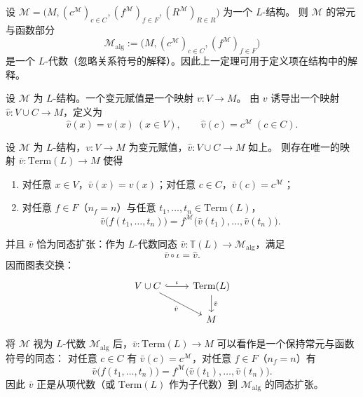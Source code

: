 \documentclass[lang=cn,a4paper,newtx,section]{elegantbook}
\begin{document}
\begin{remark}
设 $\mathcal M=\bigl(M,(c^{\mathcal M})_{c\in C},(f^{\mathcal M})_{f\in F},(R^{\mathcal M})_{R\in R}\bigr)$ 为一个 $L$-结构。
则 $\mathcal M$ 的常元与函数部分
\[
  \mathcal M_{\mathrm{alg}}:=\bigl(M,(c^{\mathcal M})_{c\in C},(f^{\mathcal M})_{f\in F}\bigr)
\]
是一个 $L$-代数（忽略关系符号的解释）。因此上一定理可用于定义项在结构中的解释。
\end{remark}

\begin{definition}[变元赋值]
设 $\mathcal M$ 为 $L$-结构。一个变元赋值是一个映射 $v:V\to M$。
由 $v$ 诱导出一个映射 $\hat v:V\cup C\to M$，定义为
\[
  \hat v(x)=v(x)\ (x\in V),\qquad \hat v(c)=c^{\mathcal M}\ (c\in C).
\]
\end{definition}

\begin{proposition}[项的解释]
设 $\mathcal M$ 为 $L$-结构，$v:V\to M$ 为变元赋值，$\hat v:V\cup C\to M$ 如上。
则存在唯一的映射 $\bar v:\mathrm{Term}(L)\to M$ 使得
\begin{enumerate}
  \item 对任意 $x\in V$，$\bar v(x)=v(x)$；对任意 $c\in C$，$\bar v(c)=c^{\mathcal M}$；
  \item 对任意 $f\in F$（$n_f=n$）与任意 $t_1,\dots,t_n\in\mathrm{Term}(L)$，
\[
  \bar v\bigl(f(t_1,\dots,t_n)\bigr)=f^{\mathcal M}\bigl(\bar v(t_1),\dots,\bar v(t_n)\bigr).
\]
\end{enumerate}
并且 $\bar v$ 恰为同态扩张：作为 $L$-代数同态 $\bar v:\mathbb T(L)\to \mathcal M_{\mathrm{alg}}$，满足
\[
  \bar v\circ\iota=\hat v.
\]
因而图表交换：
\[
\begin{tikzcd}
V\cup C \arrow[r, hook, "\iota"] \arrow[dr, "\hat v"'] & \mathrm{Term}(L) \arrow[d, "\bar v"] \\
& M
\end{tikzcd}
\]
\end{proposition}

\begin{remark}
将 $\mathcal M$ 视为 $L$-代数 $\mathcal M_{\mathrm{alg}}$ 后，$\bar v:\mathrm{Term}(L)\to M$ 可以看作是一个保持常元与函数符号的同态：
对任意 $c\in C$ 有 $\bar v(c)=c^{\mathcal M}$，对任意 $f\in F$（$n_f=n$）有
\[
  \bar v\bigl(f(t_1,\dots,t_n)\bigr)=f^{\mathcal M}\bigl(\bar v(t_1),\dots,\bar v(t_n)\bigr).
\]
因此 $\bar v$ 正是从项代数（或 $\mathrm{Term}(L)$ 作为子代数）到 $\mathcal M_{\mathrm{alg}}$ 的同态扩张。
\end{remark}
\end{document}
